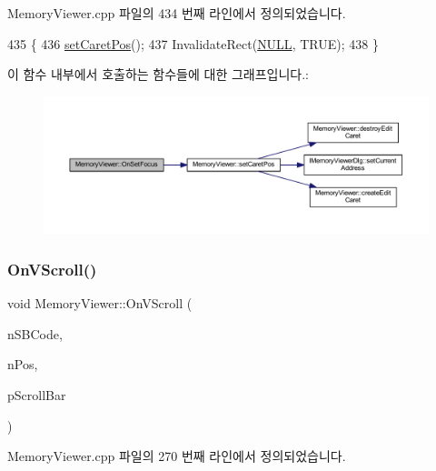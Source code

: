 Memory\+Viewer.\+cpp 파일의 434 번째 라인에서 정의되었습니다.


\begin{DoxyCode}
435 \{
436   \mbox{\hyperlink{class_memory_viewer_abfed49727a6de1b52e5495ed96816759}{setCaretPos}}();
437   InvalidateRect(\mbox{\hyperlink{getopt1_8c_a070d2ce7b6bb7e5c05602aa8c308d0c4}{NULL}}, TRUE);
438 \}
\end{DoxyCode}
이 함수 내부에서 호출하는 함수들에 대한 그래프입니다.\+:
\nopagebreak
\begin{figure}[H]
\begin{center}
\leavevmode
\includegraphics[width=350pt]{class_memory_viewer_a8a245f3c99b525dded9e776a4a5976de_cgraph}
\end{center}
\end{figure}
\mbox{\label{class_memory_viewer_ab371c01b5cc7069561f448e46e7d44a4}} 
\subsubsection{\texorpdfstring{On\+V\+Scroll()}{OnVScroll()}}
{\footnotesize\ttfamily void Memory\+Viewer\+::\+On\+V\+Scroll (\begin{DoxyParamCaption}\item[{U\+I\+NT}]{n\+S\+B\+Code,  }\item[{U\+I\+NT}]{n\+Pos,  }\item[{C\+Scroll\+Bar $\ast$}]{p\+Scroll\+Bar }\end{DoxyParamCaption})\hspace{0.3cm}{\ttfamily [protected]}}



Memory\+Viewer.\+cpp 파일의 270 번째 라인에서 정의되었습니다.



